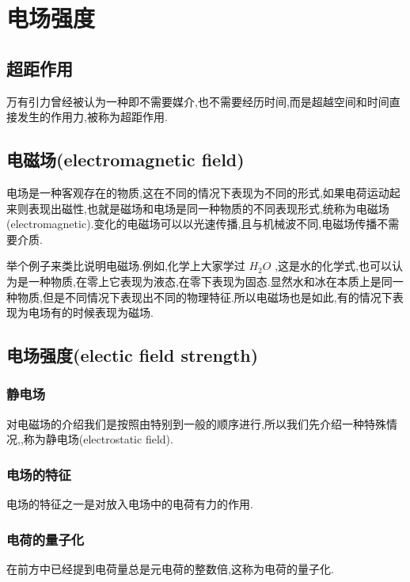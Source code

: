 \section{电场强度}
\subsection{超距作用}

万有引力曾经被认为一种即不需要媒介,也不需要经历时间,而是超越空间和时间直接发生的作用力,被称为超距作用.

\subsection{电磁场(electromagnetic field)}

电场是一种客观存在的物质,这在不同的情况下表现为不同的形式,如果电荷运动起来则表现出磁性,也就是磁场和电场是同一种物质的不同表现形式,统称为电磁场(electromagnetic).变化的电磁场可以以光速传播,且与机械波不同,电磁场传播不需要介质.

举个例子来类比说明电磁场.例如,化学上大家学过 $H_2O$ ,这是水的化学式,也可以认为是一种物质,在零上它表现为液态,在零下表现为固态.显然水和冰在本质上是同一种物质,但是不同情况下表现出不同的物理特征.所以电磁场也是如此,有的情况下表现为电场有的时候表现为磁场.

\subsection{电场强度(electic field strength)}

\subsubsection{静电场}

对电磁场的介绍我们是按照由特别到一般的顺序进行,所以我们先介绍一种特殊情况,,称为静电场(electrostatic field).

\subsubsection{电场的特征}

电场的特征之一是对放入电场中的电荷有力的作用.

\subsubsection{电荷的量子化}

在前方中已经提到电荷量总是元电荷的整数倍,这称为电荷的量子化.

